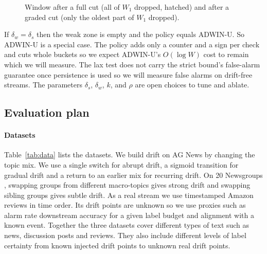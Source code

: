 \documentclass[conference]{IEEEtran}
\begin{document}
\begin{figure}[!t]
\centering
{}
\caption{Window after a full cut (all of $W_1$ dropped, hatched) and after a graded cut (only the oldest part of $W_1$ dropped).}
\label{fig:cuts}
\end{figure}

If $\delta_w=\delta_s$ then the weak zone is empty and the policy equals ADWIN-U. So ADWIN-U is a special case. The policy adds only a counter and a sign per check and cuts whole buckets so we expect ADWIN-U's $O(\log W)$ cost to remain which we will measure. The lax test does not carry the strict bound's false-alarm guarantee once persistence is used so we will measure false alarms on drift-free streams. The parameters $\delta_s$, $\delta_w$, $k$, and $\rho$ are open choices to tune and ablate.

\subsection{Evaluation plan}

\paragraph{Datasets}
Table~\ref{tab:data} lists the datasets. We build drift on AG News \cite{zhang2015} by changing the topic mix. We use a single switch for abrupt drift, a sigmoid transition for gradual drift \cite{bifet2010} and a return to an earlier mix for recurring drift. On 20 Newsgroups \cite{lang1995}, swapping groups from different macro-topics gives strong drift and swapping sibling groups gives subtle drift. As a real stream we use timestamped Amazon reviews \cite{ni2019} in time order. Its drift points are unknown so we use proxies such as alarm rate downstream accuracy for a given label budget and alignment with a known event. Together the three datasets cover different types of text such as news, discussion posts and reviews. They also include different levels of label certainty from known injected drift points to unknown real drift points.
\end{document}

